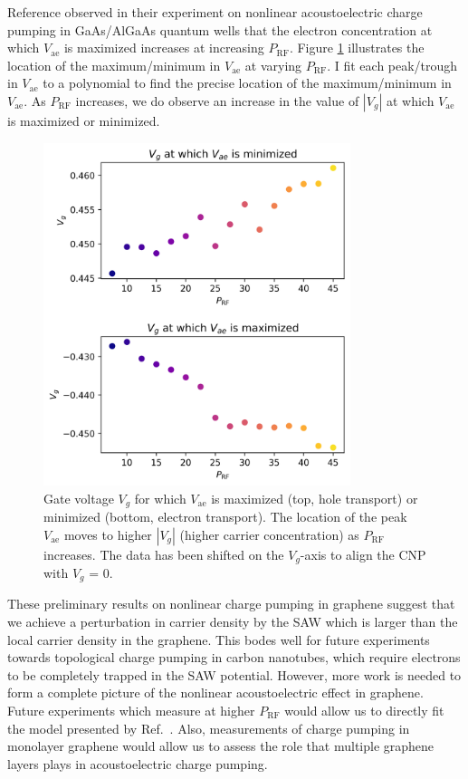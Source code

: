 \documentclass{beavtex_dub_edit}
\begin{document}
Reference \cite{rotter_nonlinear_1999} observed in their experiment on nonlinear acoustoelectric charge pumping in GaAs/AlGaAs quantum wells that the electron concentration at which $V_{\mathrm{ae}}$ is maximized increases at increasing $P_{\mathrm{RF}}$. Figure \ref{Vg at which vae is max or min} illustrates the location of the maximum/minimum in $V_{\mathrm{ae}}$ at varying $P_{\mathrm{RF}}$. I fit each peak/trough in $V_{\mathrm{ae}}$ to a polynomial to find the precise location of the maximum/minimum in $V_{\mathrm{ae}}$. As $P_{\mathrm{RF}}$ increases, we do observe an increase in the value of $|V_g|$ at which $V_{\mathrm{ae}}$ is maximized or minimized.

\begin{figure}
    \includegraphics[width = 0.8\textwidth]{Vg at which vae is max or min.png}
    \caption{Gate voltage $V_g$ for which $V_{\mathrm{ae}}$ is maximized (top, hole transport) or minimized (bottom, electron transport). The location of the peak $V_{\mathrm{ae}}$ moves to higher $|V_g|$ (higher carrier concentration) as $P_{\mathrm{RF}}$ increases. The data has been shifted on the $V_g$-axis to align the CNP with $V_g$ = 0.}
    \label{Vg at which vae is max or min}
\end{figure}


These preliminary results on nonlinear charge pumping in graphene suggest that we achieve a perturbation in carrier density by the SAW which is larger than the local carrier density in the graphene. This bodes well for future experiments towards topological charge pumping in carbon nanotubes, which require electrons to be completely trapped in the SAW potential. However, more work is needed to form a complete picture of the nonlinear acoustoelectric effect in graphene. Future experiments which measure at higher $P_{\mathrm{RF}}$ would allow us to directly fit the model presented by Ref.\ \cite{rotter_nonlinear_1999}. Also, measurements of charge pumping in monolayer graphene would allow us to assess the role that multiple graphene layers plays in acoustoelectric charge pumping. 
\end{document}
